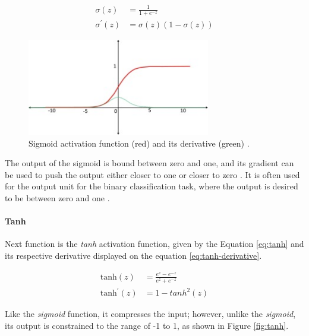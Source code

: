 \begin{align}
\label{eq:sigmoid}
    \sigma(z) &= \frac{1}{1+e^{-z}} \\
\label{eq:sigmoid-derivative}
    \sigma^{'}(z) &= \sigma(z)(1-\sigma(z))
\end{align}

\begin{figure}[H]
\begin{centering}
\includegraphics[width=8cm]{assets/images/sigmoid.jpg}
\par\end{centering}
\caption{Sigmoid activation function (red) and its derivative (green) \cite{Santosh2022-2}.}
\label{fig:sigmoid}
\end{figure}

The output of the sigmoid is bound between zero and one, and its gradient can be used to push the output either closer to one or closer to zero \cite{Santosh2022-2}. It is often used for the output unit for the binary classification task, where the output is desired to be between zero and one \cite{Santosh2022-2, Goodfellow2016}.

\paragraph{Tanh} Next function is the \textit{tanh} activation function, given by the Equation \ref{eq:tanh} and its respective derivative displayed on the equation \ref{eq:tanh-derivative}.

\begin{align}
\label{eq:tanh}
    \text{tanh}(z) &= \frac{e^z-e^{-z}}{e^z+e^{-z}} \\
\label{eq:tanh-derivative}
    \text{tanh}^{'}(z) &= 1-tanh^2(z)
\end{align}

Like the \textit{sigmoid} function, it compresses the input; however, unlike the \textit{sigmoid}, its output is constrained to the range of -1 to 1, as shown in Figure \ref{fig:tanh}.

